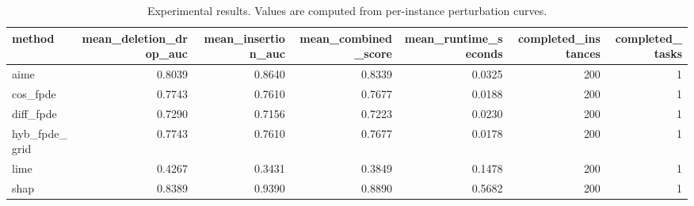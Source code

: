 \begin{table}[t]
\caption{Experimental results. Values are computed from per-instance perturbation curves.}
\label{tab:main_results_computed}
\centering
\begin{tabular}{lrrrrrr}
\toprule
method & mean\_deletion\_drop\_auc & mean\_insertion\_auc & mean\_combined\_score & mean\_runtime\_seconds & completed\_instances & completed\_tasks \\
\midrule
aime & 0.8039 & 0.8640 & 0.8339 & 0.0325 & 200 & 1 \\
cos\_fpde & 0.7743 & 0.7610 & 0.7677 & 0.0188 & 200 & 1 \\
diff\_fpde & 0.7290 & 0.7156 & 0.7223 & 0.0230 & 200 & 1 \\
hyb\_fpde\_grid & 0.7743 & 0.7610 & 0.7677 & 0.0178 & 200 & 1 \\
lime & 0.4267 & 0.3431 & 0.3849 & 0.1478 & 200 & 1 \\
shap & 0.8389 & 0.9390 & 0.8890 & 0.5682 & 200 & 1 \\
\bottomrule
\end{tabular}

\end{table}
